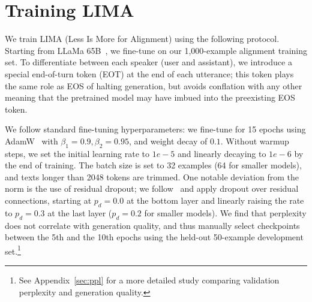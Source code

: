 \section{Training LIMA}
\label{sec:training}

We train LIMA (Less Is More for Alignment) using the following protocol.
Starting from LLaMa 65B~\citep{touvron2023llama}, we fine-tune on our 1,000-example alignment training set.
To differentiate between each speaker (user and assistant), we introduce a special end-of-turn token (EOT) at the end of each utterance; this token plays the same role as EOS of halting generation, but avoids conflation with any other meaning that the pretrained model may have imbued into the preexisting EOS token.

We follow standard fine-tuning hyperparameters:
we fine-tune for 15 epochs using AdamW~\citep{loshchilov2017decoupled} with $\beta_1=0.9, \beta_2=0.95$, and weight decay of $0.1$.
Without warmup steps, we set the initial learning rate to $1e-5$ and linearly decaying to $1e-6$ by the end of training.
The batch size is set to 32 examples (64 for smaller models), and texts longer than 2048 tokens are trimmed.
One notable deviation from the norm is the use of residual dropout; we follow~\citet{ouyang2022training} and apply dropout over residual connections, starting at $p_d = 0.0$ at the bottom layer and linearly raising the rate to $p_d = 0.3$ at the last layer ($p_d = 0.2$ for smaller models).
We find that perplexity does not correlate with generation quality, and thus manually select checkpoints between the 5th and the 10th epochs using the held-out 50-example development set.\footnote{See Appendix~\ref{sec:ppl} for a more detailed study comparing validation perplexity and generation quality.}
